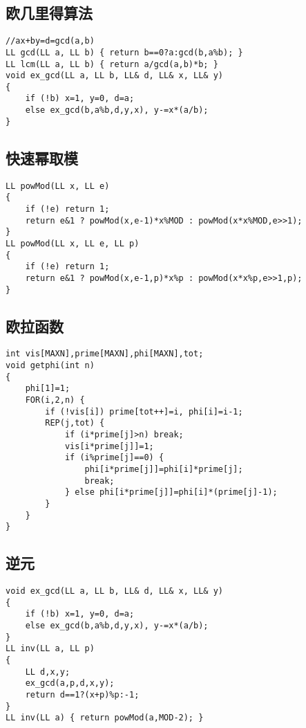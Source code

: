 \subsection{欧几里得算法}

\begin{lstlisting}
//ax+by=d=gcd(a,b)
LL gcd(LL a, LL b) { return b==0?a:gcd(b,a%b); }
LL lcm(LL a, LL b) { return a/gcd(a,b)*b; }
void ex_gcd(LL a, LL b, LL& d, LL& x, LL& y)
{
    if (!b) x=1, y=0, d=a;
    else ex_gcd(b,a%b,d,y,x), y-=x*(a/b);
}
\end{lstlisting}

\subsection{快速幂取模}

\begin{lstlisting}
LL powMod(LL x, LL e)
{
    if (!e) return 1;
    return e&1 ? powMod(x,e-1)*x%MOD : powMod(x*x%MOD,e>>1);
}
LL powMod(LL x, LL e, LL p)
{
    if (!e) return 1;
    return e&1 ? powMod(x,e-1,p)*x%p : powMod(x*x%p,e>>1,p);
}
\end{lstlisting}

\subsection{欧拉函数}

\begin{lstlisting}
int vis[MAXN],prime[MAXN],phi[MAXN],tot;
void getphi(int n)
{
    phi[1]=1;
    FOR(i,2,n) {
        if (!vis[i]) prime[tot++]=i, phi[i]=i-1;
        REP(j,tot) {
            if (i*prime[j]>n) break;
            vis[i*prime[j]]=1;
            if (i%prime[j]==0) {
                phi[i*prime[j]]=phi[i]*prime[j];
                break;
            } else phi[i*prime[j]]=phi[i]*(prime[j]-1);
        }
    }
}
\end{lstlisting}

\subsection{逆元}

\begin{lstlisting}
void ex_gcd(LL a, LL b, LL& d, LL& x, LL& y)
{
    if (!b) x=1, y=0, d=a;
    else ex_gcd(b,a%b,d,y,x), y-=x*(a/b);
}
LL inv(LL a, LL p)
{
    LL d,x,y;
    ex_gcd(a,p,d,x,y);
    return d==1?(x+p)%p:-1;
}
LL inv(LL a) { return powMod(a,MOD-2); }
\end{lstlisting}

